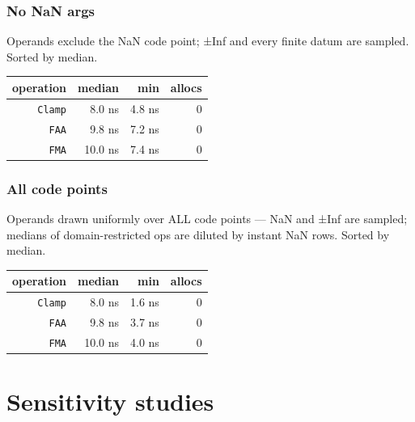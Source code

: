 \subsubsection{No NaN args}



\label{14279209625200149733}{}


Operands exclude the NaN code point; ±Inf and every finite datum are sampled. Sorted by median.




\begin{table}[h]
\centering
\begin{tabulary}{\linewidth}{R R R R}
\toprule
operation & median & min & allocs \\
\toprule
\texttt{Clamp} & 8.0 ns & 4.8 ns & 0 \\
\texttt{FAA} & 9.8 ns & 7.2 ns & 0 \\
\texttt{FMA} & 10.0 ns & 7.4 ns & 0 \\
\bottomrule
\end{tabulary}

\end{table}



\subsubsection{All code points}



\label{689699942421014554}{}


Operands drawn uniformly over ALL code points — NaN and ±Inf are sampled; medians of domain-restricted ops are diluted by instant NaN rows. Sorted by median.




\begin{table}[h]
\centering
\begin{tabulary}{\linewidth}{R R R R}
\toprule
operation & median & min & allocs \\
\toprule
\texttt{Clamp} & 8.0 ns & 1.6 ns & 0 \\
\texttt{FAA} & 9.8 ns & 3.7 ns & 0 \\
\texttt{FMA} & 10.0 ns & 4.0 ns & 0 \\
\bottomrule
\end{tabulary}

\end{table}



\section{Sensitivity studies}



